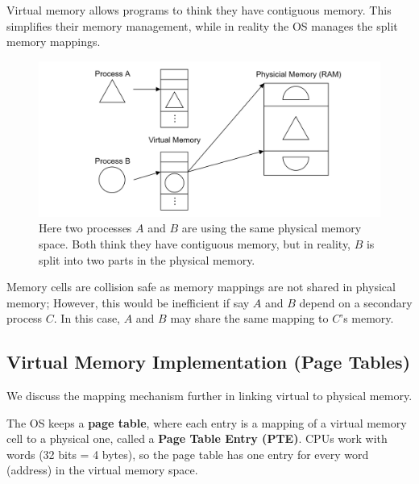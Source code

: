 \newpage
\begin{Def}

    Virtual memory allows programs to think they have contiguous memory. This simplifies their 
    memory management, while in reality the OS manages the split memory mappings.
\end{Def}

\begin{figure}[h]
    \centering
    \includegraphics[width=\textwidth]{Sections/virt/frag.png}
    
    \vspace{1em}
    \caption{Here two processes $A$ and $B$ are using the same physical memory space. Both think they have 
    contiguous memory, but in reality, $B$ is split into two parts in the physical memory.}
    
    \label{fig:virt3}
\end{figure}

\begin{Def}

    Memory cells are collision safe as memory mappings are not shared in physical memory; However, this would be 
    inefficient if say $A$ and $B$ depend on a secondary process $C$. In this case, $A$ and $B$ may share the same mapping to $C$'s memory.
\end{Def}

\subsection{Virtual Memory Implementation (Page Tables)}
\noindent
We discuss the mapping mechanism further in linking virtual to physical memory.
\begin{Def}

    The OS keeps a \textbf{page table}, where each entry is a mapping of a virtual memory cell to a physical one, called a \textbf{Page Table Entry (PTE)}.
    CPUs work with words (32 bits = 4 bytes), so the page table has one entry for every word (address) in the virtual memory space.
\end{Def}

